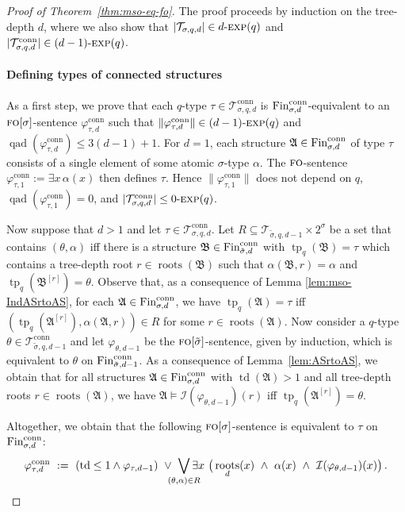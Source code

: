 \documentclass[11pt]{article}
\renewcommand{\phi}{\varphi}
\newcommand{\fin}{\textup{Fin}}
\newcommand{\conn}{\text{conn}}
\newcommand{\logic}[1]{\textsc{#1}}
\newcommand{\FO}{\logic{fo}}
\newcommand{\types}[1][\sigma,q,d]{\mathcal{T}_{#1}}
\newcommand{\ctypes}[1][\sigma,q,d]{\mathcal{T}^{\conn}_{#1}}
\newcommand{\size}[1]{\|#1\|}
\newcommand{\qad}[1]{\operatorname{qad}(#1)}
\newcommand{\absval}[1]{\vert #1 \vert}
\newcommand{\biglor}{\bigvee}
\newcommand{\I}{\mathcal{I}}
\DeclareMathOperator{\tp}{tp}
\newcommand{\struct}[1]{\mathfrak{#1}}
\newcommand{\AS}{\struct{A}}
\newcommand{\BS}{\struct{B}}
\newcommand{\td}{\operatorname{td}}
\DeclareMathOperator{\tdroot}{roots}
\newcommand{\nexp}[1][d]{\ensuremath{#1\textnormal{-}\textsc{exp}}}
\begin{document}
\begin{proof}[Proof of Theorem~\ref{thm:mso-eq-fo}]
  The proof proceeds by induction on the tree-depth $d$, where we also show that
  $\absval{\types} \in \nexp[d](q)$ and $\absval{\ctypes} \in \nexp[(d-1)](q)$. 

  \paragraph{Defining types of connected structures}

  As a first step, we prove that each $q$-type $\tau\in \ctypes$ is
  $\fin_{\sigma,d}^{\conn}$-equivalent to an $\FO[\sigma]$-sentence
  $\phi^{\conn}_{\tau,d}$ such that $\size{\phi^{\conn}_{\tau,d}}\in
  \nexp[(d-1)](q)$ and $\qad{\phi^{\conn}_{\tau,d}} \leq 3(d-1)+1$.  For $d=1$,
  each structure $\AS\in\fin_{\sigma,d}^{\conn}$ of type $\tau$ consists of a
  single element of some atomic $\sigma$-type $\alpha$. The $\FO{}$-sentence
  $\phi^{\conn}_{\tau,1} := \exists x\, \alpha(x)$ then defines $\tau$. Hence
  $\size{\phi^{\conn}_{\tau,1}}$ does not depend on $q$,
  $\qad{\phi^{\conn}_{\tau,1}} = 0$, and $\absval{\ctypes} \leq \nexp[0](q)$.

  Now suppose that $d>1$ and let $\tau\in \ctypes[\sigma,q,d]$.  Let $R\subseteq
  \types[\tilde \sigma,q,d-1] \times 2^\sigma$ be a set that contains
  $(\theta,\alpha)$ iff there is a structure $\BS\in \fin_{\tilde
    \sigma,d}^{\conn}$ with $\tp_{q}(\BS)=\tau$ which contains a tree-depth root
  $r\in \tdroot(\BS)$ such that $\alpha(\BS,r)=\alpha$ and
  $\tp_{q}(\BS^{[r]})=\theta$.  Observe that, as a consequence of Lemma
  \ref{lem:mso-IndASrtoAS}, for each $\AS\in \fin^\conn_{\sigma,d}$, we have
  $\tp_q(\AS)=\tau$ iff $(\tp_q(\AS^{[r]}), \alpha(\AS,r))\in R$ for some $r\in
  \tdroot(\AS)$.  Now consider a $q$-type $\theta\in \ctypes[\tilde \sigma,q,d-1]$
  and let $\phi_{\theta,d-1}$ be the $\FO{}[\tilde \sigma]$-sentence, given by
  induction, which is equivalent to $\theta$ on $\fin_{\tilde
    \sigma,d-1}^{\conn}$.  As a consequence of Lemma~\ref{lem:ASrtoAS}, we obtain
  that for all structures $\AS\in\fin^\conn_{\sigma,d}$ with $\td(\AS) > 1$ and
  all tree-depth roots $r\in \tdroot(\AS)$, we have
  $\AS\models\I(\phi_{\theta,d-1})(r)$ iff $\tp_q(\AS^{[r]})=\theta$.

  Altogether, we obtain that the following $\FO[\sigma]$-sentence is equivalent to $\tau$ on $\fin^\conn_{\sigma,d}$:
  \[ \phi^{\conn}_{\tau,d}\ :=\ (\td\leq 1 \land \phi_{\tau,d-1})
  \ \lor \ \smashoperator{\biglor_{(\theta,\alpha) \in
      R}}\exists x\ \big(\tdroot_d(x) \ \land \ \alpha(x)\
  \land\ \I(\phi_{\theta,d-1})(x)\big)\, .\]
  

\end{proof}
\end{document}
